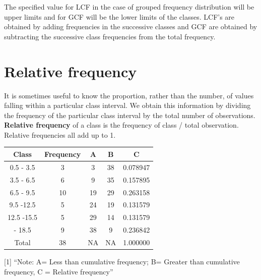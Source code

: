 \documentclass[
]{book}
\begin{document}
The specified value for LCF in the case of grouped frequency
distribution will be upper limits and for GCF will be the lower limits
of the classes. LCF's are obtained by adding frequencies in the
successive classes and GCF are obtained by subtracting the successive
class frequencies from the total frequency.

\hypertarget{relative-frequency}{%
\section{Relative frequency}\label{relative-frequency}}

It is sometimes useful to know the proportion, rather than the number,
of values falling within a particular class interval. We obtain this
information by dividing the frequency of the particular class interval
by the total number of observations. \textbf{Relative frequency} of a class
is the frequency of class / total observation. Relative frequencies all
add up to 1.

\begin{table}[H]
\centering
\begin{tabular}[t]{ccccc}
\toprule
Class & Frequency & A & B & C\\
\midrule
0.5 - 3.5 & 3 & 3 & 38 & 0.078947\\
3.5 - 6.5 & 6 & 9 & 35 & 0.157895\\
6.5 - 9.5 & 10 & 19 & 29 & 0.263158\\
9.5 -12.5 & 5 & 24 & 19 & 0.131579\\
12.5 -15.5 & 5 & 29 & 14 & 0.131579\\
\addlinespace
15.5 - 18.5 & 9 & 38 & 9 & 0.236842\\
Total & 38 & NA & NA & 1.000000\\
\bottomrule
\end{tabular}
\end{table}

{[}1{]} ``Note: A= Less than cumulative frequency; B= Greater than cumulative frequency, C = Relative frequency''

  
\end{document}
